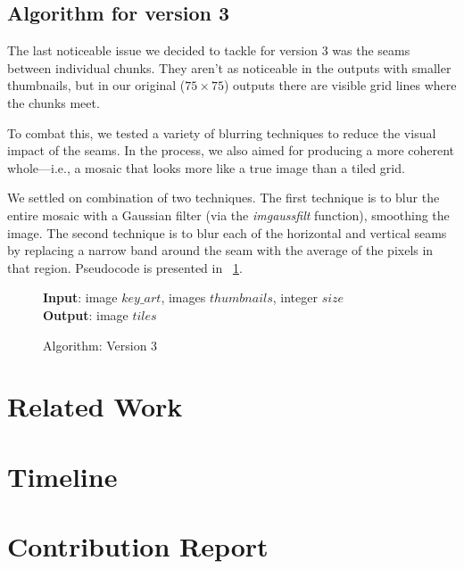 \documentclass[11pt,conference]{IEEEtran}
\begin{document}
\subsection{Algorithm for version 3}\label{S:algv3}

The last noticeable issue we decided to tackle for version 3 was the seams
between individual chunks. They aren't as noticeable in the outputs with smaller
thumbnails, but in our original (\(75 \times 75\)) outputs there are visible
grid lines where the chunks meet.

To combat this, we tested a variety of blurring techniques to reduce the visual
impact of the seams. In the process, we also aimed for producing a more coherent
whole---i.e., a mosaic that looks more like a true image than a tiled grid.

We settled on combination of two techniques. The first technique is to blur the
entire mosaic with a Gaussian filter (via the \textit{imgaussfilt} function),
smoothing the image. The second technique is to blur each of the horizontal and
vertical seams by replacing a narrow band around the seam with the average of
the pixels in that region. Pseudocode is presented in \figurename~\ref{alg:v3}.

\begin{figure}[!t]
    \textbf{Input}: image \(key\_art\), images \(thumbnails\), integer \(size\) \\
    \textbf{Output}: image \(tiles\)
    \begin{algorithmic}
        \STATE{}
        \STATE{}
        \ENDFOR
        \ENDFOR
    \end{algorithmic}
    \caption{Algorithm: Version 3}\label{alg:v3}
\end{figure}

\section{Related Work}

\section{Timeline}

\section{Contribution Report}

{\printbibliography}
\end{document}
